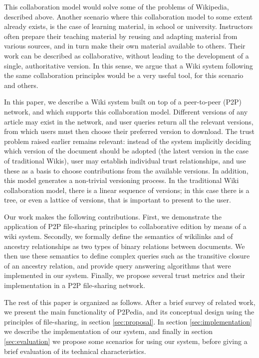 This collaboration model would solve some of the problems of Wikipedia, described above. Another scenario where this collaboration model to some extent already exists, is the case of learning material, in school or university. Instructors often prepare their teaching material by reusing and adapting material from various sources, and in turn make their own material available to others. Their work can be described as collaborative, without leading to the development of a single, authoritative version. In this sense, we argue that a Wiki system following the same collaboration principles would be a very useful tool, for this scenario and others.

In this paper, we describe a Wiki system built on top of a peer-to-peer (P2P) network, and which supports this collaboration model. Different versions of any article may exist in the network, and user queries return all the relevant versions, from which users must then choose their preferred version to download. The trust problem raised earlier remains relevant: instead of the system implicitly deciding which version of the document should be adopted (the latest version in the case of traditional Wikis), user may establish individual trust relationships, and use these as a basis to choose contributions from the available versions. In addition, this model generates a non-trivial versioning process. In the traditional Wiki collaboration model, there is a linear sequence of versions; in this case there is a tree, or even a lattice of versions, that is important to present to the user. 

Our work makes the following contributions. First, we demonstrate the application of P2P file-sharing principles to collaborative edition by means of a wiki system. Secondly, we formally define the semantics of wikilinks and of ancestry relationships as two types of binary relations between documents. We then use these semantics to define complex queries such as the transitive closure of an ancestry relation, and provide query answering algorithms that were implemented in our system. Finally, we propose several trust metrics and their implementation in a P2P file-sharing network.

The rest of this paper is organized as follows. After a brief survey of related work, we present the main functionality of P2Pedia, and its conceptual  design using the principles of file-sharing, in section \ref{sec:proposal}. In section \ref{sec:implementation} we describe the implementation of our system, and finally in section \ref{sec:evaluation} we propose some scenarios for using our system, before giving a brief evaluation of its technical characteristics.